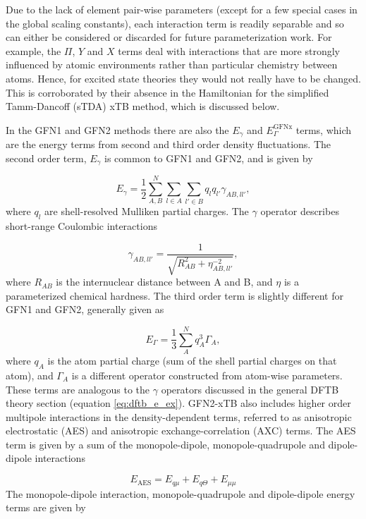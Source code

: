 Due to the lack of element pair-wise parameters (except for a few special cases 
in the global scaling constants), each interaction term is readily separable and
so can either be considered or discarded for future parameterization work. For example, 
the $\Pi$, $Y$ and $X$ terms deal with interactions that are more strongly influenced
by atomic environments rather than particular chemistry between atoms. Hence, for 
excited state theories they would not really have to be changed. This is corroborated 
by their absence in the Hamiltonian for the simplified Tamm-Dancoff (sTDA) xTB \cite{Grimme2016} 
method, which is discussed below.

In the GFN1 and GFN2 methods there are also the $E_\gamma$ and $E_\Gamma^{\text{GFNx}}$ 
terms, which are the energy terms from second and third order density fluctuations. 
The second order term, $E_\gamma$ is common to GFN1 and GFN2, and is given by

\begin{equation}
E_\gamma = \frac{1}{2} \sum^{N}_{A,B} \sum_{l \in A} \sum_{l' \in B} q_l q_{l'} \gamma_{AB, ll'},
\end{equation}
%
where $q_l$ are shell-resolved Mulliken partial charges. The $\gamma$ operator describes 
short-range Coulombic interactions

\begin{equation}
\gamma_{AB, ll'} = \frac{1}{\sqrt{R^2_{AB} + \eta^{-2}_{AB, ll'}}},
\end{equation}
%
where $R_{AB}$ is the internuclear distance between A and B, and $\eta$ is a parameterized 
chemical hardness. The third order term is slightly different for GFN1 and GFN2,
generally given as

\begin{equation}
E_\Gamma = \frac{1}{3}\sum_A^N q_A^3 \Gamma_A,
\end{equation}
%
where $q_A$ is the atom partial charge (sum of the shell partial charges on that atom), 
and $\Gamma_A$ is a different operator constructed from atom-wise parameters. These
terms are analogous to the $\gamma$ operators discussed in the general DFTB theory
section (equation \ref{eq:dftb_e_ex}). GFN2-xTB also includes higher order multipole 
interactions in the density-dependent terms, referred to as anisotropic electrostatic 
(AES) and anisotropic exchange-correlation (AXC) terms. The AES term is given by 
a sum of the monopole-dipole, monopole-quadrupole and dipole-dipole interactions

\begin{equation}
    E_{\text{AES}} = E_{q\mu} + E_{q \Theta} + E_{\mu\mu}
\end{equation}
%
The monopole-dipole interaction, monopole-quadrupole and dipole-dipole energy terms 
are given by

